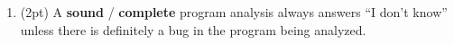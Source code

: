 \documentclass{report}
\newif\ifkey
\newcommand{\correct}[1]{\ifkey\color{red}\textbf{#1}\color{black}\else\textbf{#1}\fi\xspace}
\newcommand{\answershort}[1]{\ifkey\color{red}\underline{\textbf{#1}}\color{black}\else\underline{\hspace{3in}}\fi\xspace}
\newcommand{\vshortpts}{24}
\newcommand*{\pts}[1]{\addtocounter{points}{#1}(#1pt)}
\begin{document}
\begin{spacing}{1.4}
\begin{enumerate}[leftmargin=*]
  \newpage

  \textbf{II. Multiple Choice and Very Short Answer (\vshortpts pts).} In the following section, either circle your
  answer (possible answers appear in \textbf{bold}) or write a very short (one word or one phrase) answer in the space provided.


\item \pts{2} A \textbf{sound} / \correct{complete} program analysis always answers ``I don't know'' unless there
  is definitely a bug in the program being analyzed.






\end{enumerate}
\end{spacing}
\end{document}
